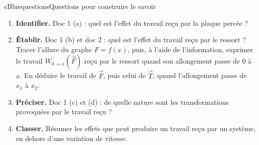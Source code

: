\documentclass[11pt,a4paper]{article}
\newcommand{\vect}[1]{\overrightarrow{#1}}
\newcommand{\kw}[1]{{\sffamily\bfseries\color{cBlue}#1}}   %
\begin{document}
\begin{rub}{cBlue}{questions}{Questions pour construire le savoir}
\begin{enumerate}
  \item \kw{Identifier.} Doc 1 (a) : quel est l’effet du travail reçu par la plaque percée ?
  \item \kw{Établir.} Doc 1 (b) et doc 2 : quel est l’effet du travail reçu par le ressort ? Tracer l’allure du graphe $F = f(x)$, puis, à l’aide de l’information, exprimer le travail $W_{0\to x}(\vect F)$ reçu par le ressort quand son allongement passe de 0 à $x$. En déduire le travail de $\vect F$, puis celui de $\vect T$, quand l’allongement passe de $x_1$ à $x_2$.
  \item \kw{Préciser.} Doc 1 (c) et (d) : de quelle nature sont les transformations provoquées par le travail reçu ?
  \item \kw{Classer.} Résumer les effets que peut produire un travail reçu par un système, en dehors d’une variation de vitesse.
\end{enumerate}
\end{rub}
\end{document}
